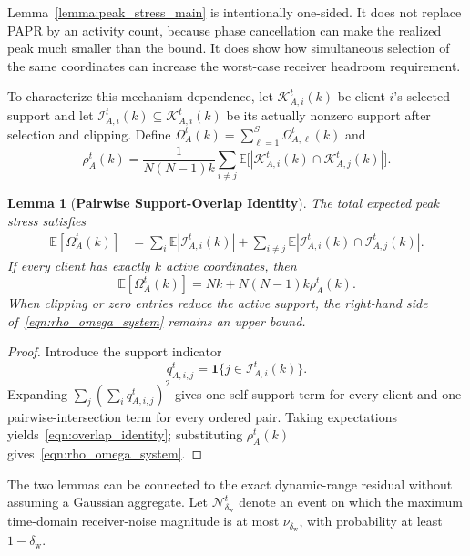 \documentclass[journal]{IEEEtran}
\newenvironment{revisionblock}{\begingroup\color{revisionred}}{\endgroup}
\newtheorem{lemma}{Lemma}
\begin{document}
\begin{revisionblock}
Lemma~\ref{lemma:peak_stress_main} is intentionally one-sided. It does not replace PAPR by an activity count, because phase cancellation can make the realized peak much smaller than the bound. It does show how simultaneous selection of the same coordinates can increase the worst-case receiver headroom requirement.

To characterize this mechanism dependence, let $\mathcal{K}_{A,i}^t(k)$ be client $i$'s selected support and let $\mathcal{I}_{A,i}^t(k)\subseteq\mathcal{K}_{A,i}^t(k)$ be its actually nonzero support after selection and clipping. Define $\Omega_A^t(k)=\sum_{\ell=1}^{S}\Omega_{A,\ell}^t(k)$ and
{
\begin{equation}
	\rho_A^t(k)
	=\frac{1}{N(N-1)k}
	\sum_{i\ne j}\mathbb{E}
	\big[|\mathcal{K}_{A,i}^t(k)\cap\mathcal{K}_{A,j}^t(k)|\big].
\end{equation}
}

\begin{lemma}[\bf Pairwise Support-Overlap Identity]
\label{lemma:overlap_main}
The total expected peak stress satisfies
{
\begin{align}
	\mathbb{E}[\Omega_A^t(k)]
	&=\sum_i\mathbb{E}|\mathcal{I}_{A,i}^t(k)|
	+\sum_{i\ne j}\mathbb{E}
	|\mathcal{I}_{A,i}^t(k)\cap\mathcal{I}_{A,j}^t(k)|.
	\label{eqn:overlap_identity}
\end{align}
}
If every client has exactly $k$ active coordinates, then
{
\begin{equation}
	\mathbb{E}[\Omega_A^t(k)]
	=Nk+N(N-1)k\rho_A^t(k).
	\label{eqn:rho_omega_system}
\end{equation}
}
When clipping or zero entries reduce the active support, the right-hand side of~\eqref{eqn:rho_omega_system} remains an upper bound.
\end{lemma}
\begin{proof}
Introduce the support indicator
{
\begin{equation}
	q_{A,i,j}^t=\mathbf{1}\{j\in\mathcal{I}_{A,i}^t(k)\}.
\end{equation}
}
Expanding $\sum_j(\sum_iq_{A,i,j}^t)^2$ gives one self-support term for every client and one pairwise-intersection term for every ordered pair. Taking expectations yields~\eqref{eqn:overlap_identity}; substituting $\rho_A^t(k)$ gives~\eqref{eqn:rho_omega_system}.
\end{proof}

The two lemmas can be connected to the exact dynamic-range residual without assuming a Gaussian aggregate. Let $\mathcal{N}_{\delta_{\mathrm w}}^t$ denote an event on which the maximum time-domain receiver-noise magnitude is at most $\nu_{\delta_{\mathrm w}}$, with probability at least $1-\delta_{\mathrm w}$.


\end{revisionblock}
\end{document}
